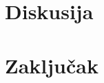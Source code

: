 \documentclass[12pt,oneside]{memoir}
\begin{document}
\chapter{Diskusija}
\chapter{Zaključak}




\literatura

\backmatter

\end{document}
